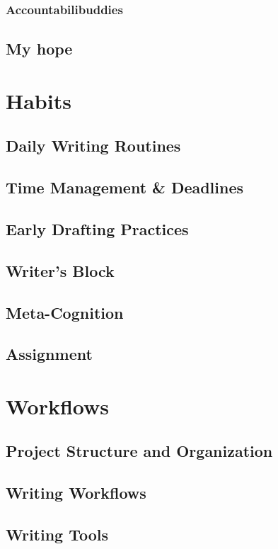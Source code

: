 \documentclass[12pt]{article}
\begin{document}
\subsubsection{Accountabilibuddies}
\subsection{My hope}

\section{Habits}
\subsection{Daily Writing Routines}
\subsection{Time Management \& Deadlines}
\subsection{Early Drafting Practices}
\subsection{Writer's Block}
\subsection{Meta-Cognition}
\subsection{Assignment}

\section{Workflows}
\subsection{Project Structure and Organization}
\subsection{Writing Workflows}
\subsection{Writing Tools}
\end{document}
